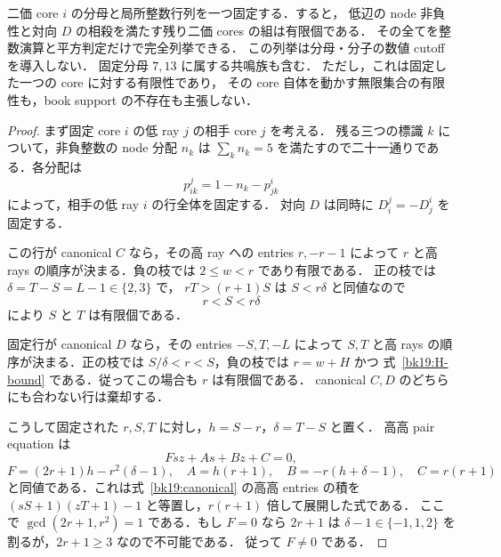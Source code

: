 \begin{theorem}
\label{bk19:finite-completion}
二価 core $i$ の分母と局所整数行列を一つ固定する．すると，
低辺の node 非負性と対向 $D$ の相殺を満たす残り二価 cores の組は有限個である．
その全てを整数演算と平方判定だけで完全列挙できる．
この列挙は分母・分子の数値 cutoff を導入しない．
固定分母 $7,13$ に属する共鳴族も含む．
ただし，これは固定した一つの core に対する有限性であり，
その core 自体を動かす無限集合の有限性も，book support の不存在も主張しない．
\end{theorem}

\begin{proof}
まず固定 core $i$ の低 ray $j$ の相手 core $j$ を考える．
残る三つの標識 $k$ について，非負整数の node 分配 $n_k$ は
$\sum_kn_k=5$ を満たすので二十一通りである．各分配は
\begin{equation}\label{bk19:fixed-row}
 p^j_{ik}=1-n_k-p^i_{jk}
\end{equation}
によって，相手の低 ray $i$ の行全体を固定する．
対向 $D$ は同時に $D^j_i=-D^i_j$ を固定する．

この行が canonical $C$ なら，その高 ray への entries $r,-r-1$ によって
$r$ と高 rays の順序が決まる．負の枝では $2\le w<r$ であり有限である．
正の枝では $\delta=T-S=L-1\in\{2,3\}$ で，
$rT>(r+1)S$ は $S<r\delta$ と同値なので
\[
 r<S<r\delta
\]
により $S$ と $T$ は有限個である．

固定行が canonical $D$ なら，その entries $-S,T,-L$ によって
$S,T$ と高 rays の順序が決まる．正の枝では
$S/\delta<r<S$，負の枝では $r=w+H$ かつ
式~\eqref{bk19:H-bound} である．従ってこの場合も $r$ は有限個である．
canonical $C,D$ のどちらにも合わない行は棄却する．

こうして固定された $r,S,T$ に対し，$h=S-r$，$\delta=T-S$ と置く．
高高 pair equation は
\begin{equation}\label{bk19:bilinear}
 Fsz+As+Bz+C=0,
\end{equation}
\[
 F=(2r+1)h-r^2(\delta-1),\quad
 A=h(r+1),\quad B=-r(h+\delta-1),\quad C=r(r+1)
\]
と同値である．これは式~\eqref{bk19:canonical} の高高 entries の積を
$(sS+1)(zT+1)-1$ と等置し，$r(r+1)$ 倍して展開した式である．
ここで $\gcd(2r+1,r^2)=1$ である．もし $F=0$ なら
$2r+1$ は $\delta-1\in\{-1,1,2\}$ を割るが，$2r+1\ge3$ なので不可能である．
従って $F\ne0$ である．


\end{proof}
